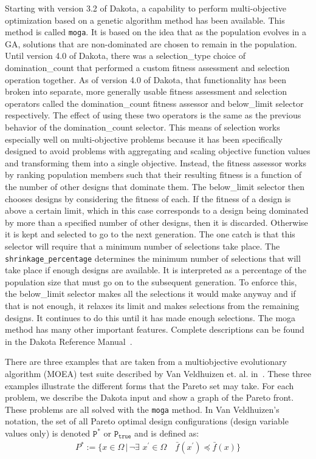 Starting with version 3.2 of Dakota, a capability to perform
multi-objective optimization based on a genetic algorithm method has
been available. This method is called \texttt{moga}. It is based on
the idea that as the population evolves in a GA, solutions that are
non-dominated are chosen to remain in the population. Until version
4.0 of Dakota, there was a selection\_type choice of domination\_count
that performed a custom fitness assessment and selection operation
together. As of version 4.0 of Dakota, that functionality has been
broken into separate, more generally usable fitness assessment and
selection operators called the domination\_count fitness assessor and
below\_limit selector respectively. The effect of using these two
operators is the same as the previous behavior of the
domination\_count selector. This means of selection works especially
well on multi-objective problems because it has been specifically
designed to avoid problems with aggregating and scaling objective
function values and transforming them into a single
objective. Instead, the fitness assessor works by ranking population
members such that their resulting fitness is a function of the number
of other designs that dominate them. The below\_limit selector then
chooses designs by considering the fitness of each. If the fitness of
a design is above a certain limit, which in this case corresponds to a
design being dominated by more than a specified number of other
designs, then it is discarded. Otherwise it is kept and selected to go
to the next generation. The one catch is that this selector will
require that a minimum number of selections take
place. The \texttt{shrinkage\_percentage} determines the minimum number of
selections that will take place if enough designs are available. It is
interpreted as a percentage of the population size that must go on to
the subsequent generation. To enforce this, the below\_limit selector
makes all the selections it would make anyway and if that is not
enough, it relaxes its limit and makes selections from the remaining
designs. It continues to do this until it has made enough selections.
The moga method has many other important features. Complete
descriptions can be found in the Dakota Reference Manual~\cite{RefMan}.

There are three examples that are taken from a multiobjective 
evolutionary algorithm (MOEA) test suite described by Van Veldhuizen
et. al. in~\cite{Coe02}. These three examples 
illustrate the different forms that the Pareto set may take. For each
problem, we describe the Dakota input and show a graph of the Pareto
front. These problems are all solved with the \texttt{moga} method.
In Van Veldhuizen's notation, the set of all Pareto optimal design
configurations (design variable values only) is denoted $\mathtt{P^*}$
or $\mathtt{P_{true}}$ and is defined as:
\begin{eqnarray*}
  P^*:=\{x\in\Omega\,|\,\neg\exists\,\,
  x^\prime\in\Omega\quad\bar{f}(x^\prime)\preceq\bar{f}(x)\}
\end{eqnarray*}

